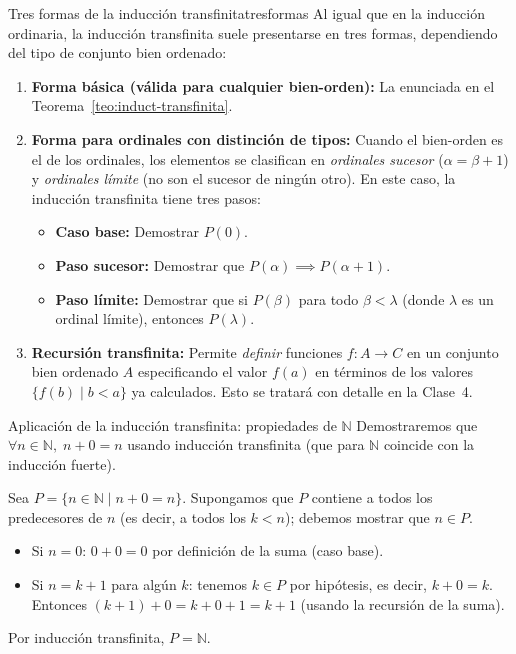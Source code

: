 \begin{observacion}{Tres formas de la inducción transfinita}{tresformas}
Al igual que en la inducción ordinaria, la inducción transfinita suele presentarse en tres formas, dependiendo del tipo de conjunto bien ordenado:
\begin{enumerate}[leftmargin=2em, label=(\arabic*)]
  \item \textbf{Forma básica (válida para cualquier bien-orden):} La enunciada en el Teorema~\ref{teo:induct-transfinita}.

  \item \textbf{Forma para ordinales con distinción de tipos:} Cuando el bien-orden es el de los ordinales, los elementos se clasifican en \emph{ordinales sucesor} ($\alpha = \beta + 1$) y \emph{ordinales límite} (no son el sucesor de ningún otro). En este caso, la inducción transfinita tiene tres pasos:
  \begin{itemize}[leftmargin=2em]
    \item \textbf{Caso base:} Demostrar $P(0)$.
    \item \textbf{Paso sucesor:} Demostrar que $P(\alpha) \implies P(\alpha+1)$.
    \item \textbf{Paso límite:} Demostrar que si $P(\beta)$ para todo $\beta < \lambda$ (donde $\lambda$ es un ordinal límite), entonces $P(\lambda)$.
  \end{itemize}

  \item \textbf{Recursión transfinita:} Permite \emph{definir} funciones $f: A \to C$ en un conjunto bien ordenado $A$ especificando el valor $f(a)$ en términos de los valores $\{f(b) \mid b < a\}$ ya calculados. Esto se tratará con detalle en la Clase~4.
\end{enumerate}
\end{observacion}

\begin{ejemplo}{Aplicación de la inducción transfinita: propiedades de $\mathbb{N}$}{}
Demostraremos que $\forall n \in \mathbb{N},\; n + 0 = n$ usando inducción transfinita (que para $\mathbb{N}$ coincide con la inducción fuerte).

Sea $P = \{n \in \mathbb{N} \mid n + 0 = n\}$. Supongamos que $P$ contiene a todos los predecesores de $n$ (es decir, a todos los $k < n$); debemos mostrar que $n \in P$.
\begin{itemize}[leftmargin=2em]
  \item Si $n = 0$: $0 + 0 = 0$ por definición de la suma (caso base).
  \item Si $n = k+1$ para algún $k$: tenemos $k \in P$ por hipótesis, es decir, $k + 0 = k$. Entonces $(k+1) + 0 = k + 0 + 1 = k + 1$ (usando la recursión de la suma).
\end{itemize}
Por inducción transfinita, $P = \mathbb{N}$.
\end{ejemplo}

